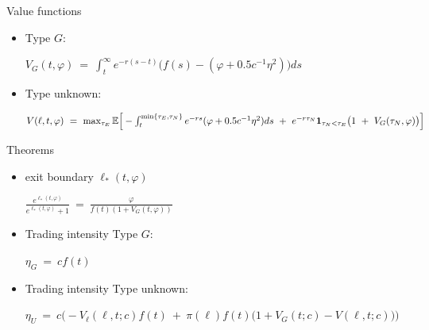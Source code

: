 \documentclass{beamer}
\begin{document}
\begin{frame}
	
\begin{block}{Value functions}
	\begin{itemize}
		\item 	Type $G$:
		
		$
		V_G(t, \varphi)\ =\ \int_t^\infty e^{-r(s-t)}\big(f(s)-(\varphi + 0.5 c^{-1} \eta^2)\big)ds\
		$
		
		\item Type unknown:
		
		$
		V(\ell, t, \varphi)\ =\ \max_{\tau_E} \mathbb{E}\Big[
		-\int_t^{\min\{\tau_E,\tau_N\}}  e^{-r s} (\varphi + 0.5 c^{-1} \eta^2) ds\ +\ e^{-r\tau_N} {\bf 1}_{\tau_N<\tau_E}\big(1\ +\ V_G(\tau_N,\varphi)\big)\Big]
		$
	\end{itemize}
\end{block}

\begin{block}{Theorems}
		\begin{itemize}
		\item exit boundary $\ell_*(t,\varphi)$
		
			$\frac{e^{\ell_*(t,\varphi)}}{e^{\ell_*(t,\varphi)}+1}\ =\ \frac{\varphi}{f(t)(1+V_G(t,\varphi))} $
		\item 	Trading intensity Type $G$:
		
		$
\eta_G\ =\ c f(t)
		$
		
		\item Trading intensity Type unknown:
		
$\eta_U\ =\ c\Big(-V_\ell (\ell, t;c) f(t)\ +\ \pi(\ell) f(t) \big(1+V_G(t;c) - V(\ell, t;c)\big)\Big)$
	\end{itemize}

\end{block}

\end{frame}
\end{document}

